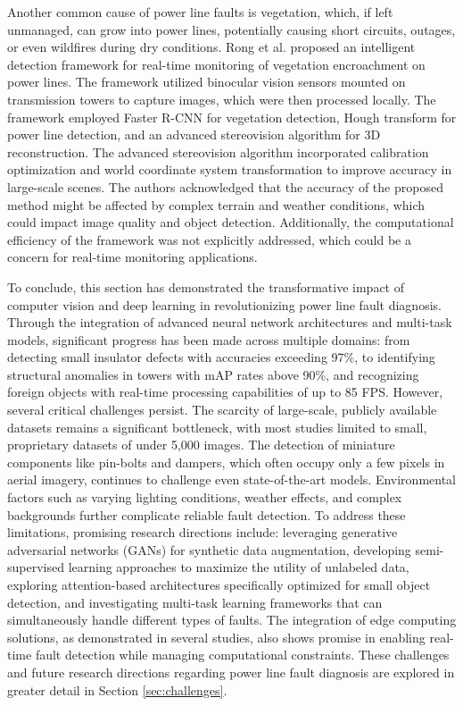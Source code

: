 Another common cause of power line faults is vegetation, which, if left unmanaged, can grow into power lines, potentially causing short circuits, outages, or even wildfires during dry conditions. Rong et al. \cite{rong_intelligent_2021} proposed an intelligent detection framework for real-time monitoring of vegetation encroachment on power lines. The framework utilized binocular vision sensors mounted on transmission towers to capture images, which were then processed locally. The framework employed Faster R-CNN for vegetation detection, Hough transform for power line detection, and an advanced stereovision algorithm for 3D reconstruction. The advanced stereovision algorithm incorporated calibration optimization and world coordinate system transformation to improve accuracy in large-scale scenes. The authors acknowledged that the accuracy of the proposed method might be affected by complex terrain and weather conditions, which could impact image quality and object detection. Additionally, the computational efficiency of the framework was not explicitly addressed, which could be a concern for real-time monitoring applications. 

To conclude, this section has demonstrated the transformative impact of computer vision and deep learning in revolutionizing power line fault diagnosis. Through the integration of advanced neural network architectures and multi-task models, significant progress has been made across multiple domains: from detecting small insulator defects with accuracies exceeding 97\%, to identifying structural anomalies in towers with mAP rates above 90\%, and recognizing foreign objects with real-time processing capabilities of up to 85 FPS. However, several critical challenges persist. The scarcity of large-scale, publicly available datasets remains a significant bottleneck, with most studies limited to small, proprietary datasets of under 5,000 images. The detection of miniature components like pin-bolts and dampers, which often occupy only a few pixels in aerial imagery, continues to challenge even state-of-the-art models. Environmental factors such as varying lighting conditions, weather effects, and complex backgrounds further complicate reliable fault detection. To address these limitations, promising research directions include: leveraging generative adversarial networks (GANs) for synthetic data augmentation, developing semi-supervised learning approaches to maximize the utility of unlabeled data, exploring attention-based architectures specifically optimized for small object detection, and investigating multi-task learning frameworks that can simultaneously handle different types of faults. The integration of edge computing solutions, as demonstrated in several studies, also shows promise in enabling real-time fault detection while managing computational constraints. These challenges and future research directions regarding power line fault diagnosis are explored in greater detail in Section \ref{sec:challenges}.
